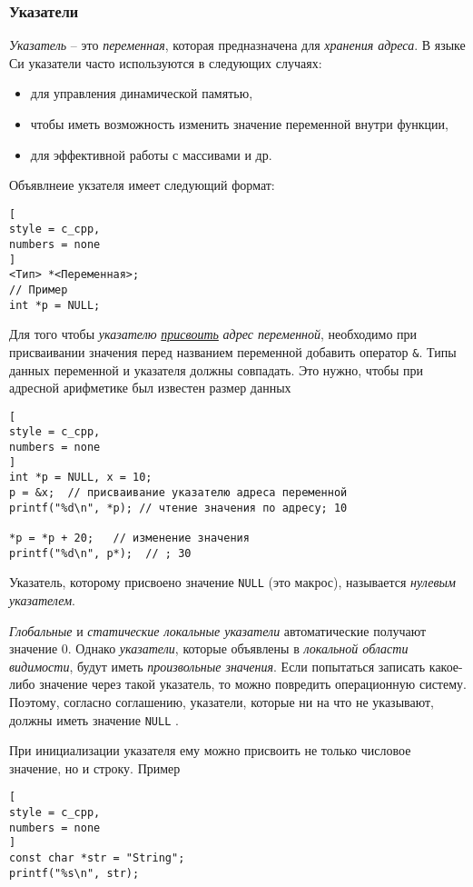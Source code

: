 \documentclass[%
	11pt,
	a4paper,
	utf8,
		]{article}
\begin{document}
\subsubsection{Указатели}

\emph{Указатель} -- это \emph{переменная}, которая предназначена для \emph{хранения адреса}. В языке Си указатели часто используются в следующих случаях:
\begin{itemize}
	\item для управления динамической памятью,
	
	\item чтобы иметь возможность изменить значение переменной внутри функции,
	
	\item для эффективной работы с массивами и др.
\end{itemize}

Объявлнеие укзателя имеет следующий формат:
\begin{lstlisting}[
style = c_cpp,
numbers = none
]
<Тип> *<Переменная>;
// Пример
int *p = NULL;
\end{lstlisting}

Для того чтобы \emph{указателю} \underline{\itshape присвоить} \emph{адрес переменной}, необходимо при присваивании значения перед названием переменной добавить оператор \verb*|&|. Типы данных переменной и указателя должны совпадать. Это нужно, чтобы при адресной арифметике был известен размер данных
\begin{lstlisting}[
style = c_cpp,
numbers = none
]
int *p = NULL, x = 10;
p = &x;  // присваивание указателю адреса переменной
printf("%d\n", *p); // чтение значения по адресу; 10

*p = *p + 20;   // изменение значения
printf("%d\n", p*);  // ; 30
\end{lstlisting}

Указатель, которому присвоено значение \verb|NULL| (это макрос), называется \emph{нулевым указателем}.

\emph{Глобальные} и \emph{статические локальные указатели} автоматические получают значение 0. Однако \emph{указатели}, которые объявлены в \emph{локальной области видимости}, будут иметь \emph{\color{red}произвольные значения}. Если попытаться записать какое-либо значение через такой указатель, то можно повредить операционную систему. Поэтому, согласно соглашению, указатели, которые ни на что не указывают, должны иметь значение \verb*|NULL| \cite[]{prokhorenok-prog-c:2020}.

При инициализации указателя ему можно присвоить не только числовое значение, но и строку. Пример
\begin{lstlisting}[
style = c_cpp,
numbers = none	
]
const char *str = "String";
printf("%s\n", str);
\end{lstlisting}
\end{document}
